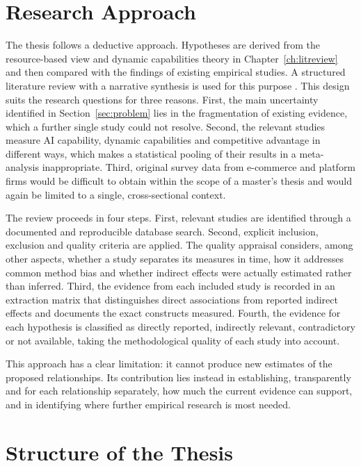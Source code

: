 \section{Research Approach}
\label{sec:approach}

The thesis follows a deductive approach. Hypotheses are derived from the resource-based view and dynamic capabilities theory in Chapter~\ref{ch:litreview} and then compared with the findings of existing empirical studies. A structured literature review with a narrative synthesis is used for this purpose \parencite{booth2025}. This design suits the research questions for three reasons. First, the main uncertainty identified in Section~\ref{sec:problem} lies in the fragmentation of existing evidence, which a further single study could not resolve. Second, the relevant studies measure AI capability, dynamic capabilities and competitive advantage in different ways, which makes a statistical pooling of their results in a meta-analysis inappropriate. Third, original survey data from e-commerce and platform firms would be difficult to obtain within the scope of a master's thesis and would again be limited to a single, cross-sectional context.

The review proceeds in four steps. First, relevant studies are identified through a documented and reproducible database search. Second, explicit inclusion, exclusion and quality criteria are applied. The quality appraisal considers, among other aspects, whether a study separates its measures in time, how it addresses common method bias and whether indirect effects were actually estimated rather than inferred. Third, the evidence from each included study is recorded in an extraction matrix that distinguishes direct associations from reported indirect effects and documents the exact constructs measured. Fourth, the evidence for each hypothesis is classified as directly reported, indirectly relevant, contradictory or not available, taking the methodological quality of each study into account.

This approach has a clear limitation: it cannot produce new estimates of the proposed relationships. Its contribution lies instead in establishing, transparently and for each relationship separately, how much the current evidence can support, and in identifying where further empirical research is most needed.

\section{Structure of the Thesis}
\label{sec:structure}

